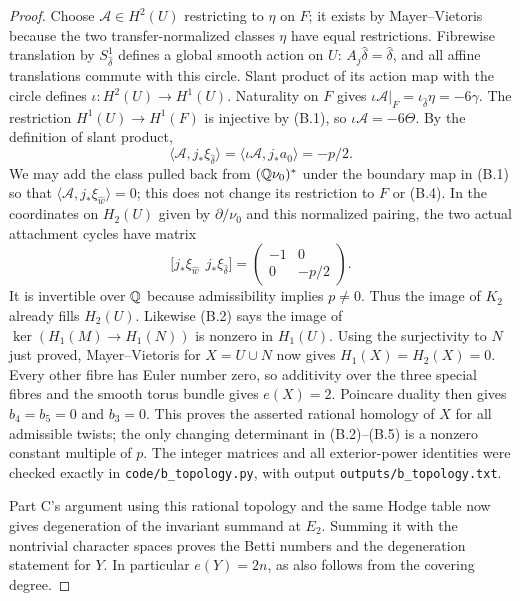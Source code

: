 \begin{proof}
Choose $\mathcal A\in H^2(U)$ restricting to $\eta$ on $F$;
it exists by Mayer--Vietoris because the two transfer-normalized
classes $\eta$ have equal restrictions. Fibrewise translation by
$S^1_{\hat\delta}$ defines a global smooth action on $U$:
$A_j\hat\delta=\hat\delta$, and all affine translations commute
with this circle. Slant product of its action map with the circle
defines $\iota:H^2(U)\to H^1(U)$. Naturality on $F$ gives
$\iota\mathcal A|_F=\iota_{\hat\delta}\eta=-6\gamma$.
The restriction $H^1(U)\to H^1(F)$ is injective by (B.1), so
$\iota\mathcal A=-6\Theta$. By the definition of slant product,
\[
 \langle\mathcal A,j_*\xi_{\hat\delta}\rangle
 =\langle\iota\mathcal A,j_*a_0\rangle=-p/2.           \tag{B.4}
\]
We may add the class pulled back from $(\mathbb Q\nu_0)^*$ under
the boundary map in (B.1) so that
$\langle\mathcal A,j_*\xi_{\hat w}\rangle=0$;
this does not change its restriction to $F$ or (B.4).
In the coordinates on $H_2(U)$ given by $\partial/\nu_0$ and
this normalized pairing, the two actual attachment cycles have
matrix
\[
 \bigl[j_*\xi_{\hat w}\ \ j_*\xi_{\hat\delta}\bigr]
 =\begin{pmatrix}-1&0\\0&-p/2\end{pmatrix}.             \tag{B.5}
\]
It is invertible over $\mathbb Q$ because admissibility implies
$p\ne0$. Thus the image of $K_2$ already fills $H_2(U)$.
Likewise (B.2) says the image of $\ker(H_1(M)\to H_1(N))$
is nonzero in $H_1(U)$. Using the surjectivity to $N$ just proved,
Mayer--Vietoris for $X=U\cup N$ now gives $H_1(X)=H_2(X)=0$.
Every other fibre has Euler number zero, so additivity over the
three special fibres and the smooth torus bundle gives $e(X)=2$.
Poincare duality then gives $b_4=b_5=0$ and $b_3=0$.
This proves the asserted rational homology of $X$ for all admissible
twists; the only changing determinant in (B.2)--(B.5) is a nonzero
constant multiple of $p$. The integer matrices and all exterior-power
identities were checked exactly in \texttt{code/b\_topology.py},
with output \texttt{outputs/b\_topology.txt}.

Part C's argument using this rational topology and the same Hodge
table now gives degeneration of the invariant summand at $E_2$.
Summing it with the nontrivial character spaces proves the Betti
numbers and the degeneration statement for $Y$. In particular
$e(Y)=2n$, as also follows from the covering degree.
\end{proof}
